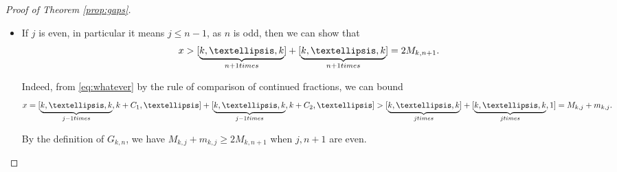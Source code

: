 \documentclass{amsart}
\theoremstyle{definition}
\newcommand{\0}{\mbf 0}%
\renewcommand{\text}{\textup}
\begin{document}
\begin{proof}[Proof of Theorem \ref{prop:gaps}]
\begin{itemize}


    \item If $j$ is even, in particular it means $j\leq n-1$, as $n$ is odd, then we can show that 
    $$
    x>[\underbrace{k,\ldots,k}_{n+1 \text{ times }}] + [\underbrace{k,\ldots,k}_{n+1 \text{ times }}]=2M_{k,n+1}.
    $$


Indeed, from \eqref{eq:whatever} by the rule of comparison of continued fractions, we can bound 
$$
x =[\underbrace{k,\ldots,k}_{j-1 \text{ times }},k+C_1,\ldots] + [\underbrace{k,\ldots,k}_{j-1 \text{ times }},k+C_2,\ldots] > [\underbrace{k,\ldots,k}_{j \text{ times }}] + [\underbrace{k,\ldots,k}_{j \text{ times }},1]=M_{k,j}+m_{k,j}.
$$

By the definition of $G_{k,n}$, we have $M_{k,j}+m_{k,j} \geq 2M_{k,n+1}$ when $j,n+1$ are even.

    
\end{itemize}

\end{proof}
\end{document}
